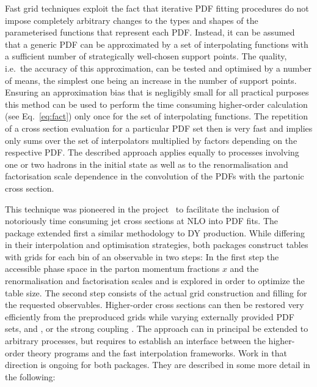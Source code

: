 \begin{description}
  Fast grid techniques exploit the fact that iterative PDF fitting
  procedures do not impose completely arbitrary changes to the types
  and shapes of the parameterised functions that represent each PDF\@.
  Instead, it can be assumed that a generic PDF can be approximated by
  a set of interpolating functions with a sufficient number of
  strategically well-chosen support points. The quality, i.e.\ the
  accuracy of this approximation, can be tested and optimised by a
  number of means, the simplest one being an increase in the number of
  support points. Ensuring an approximation bias that is negligibly
  small for all practical purposes this method can be used to perform
  the time consuming higher-order calculation (see Eq.~\ref{eq:fact})
  only once for the set of interpolating functions. 
  The repetition of a cross section evaluation for
  a particular PDF set then is very fast and implies only sums over
  the set of interpolators multiplied by factors depending on the
  respective PDF\@. The described approach applies equally to
  processes involving one or two hadrons in the initial state as well
  as to the renormalisation and factorisation scale dependence in the
  convolution of the PDFs with the partonic cross section.

  This technique was pioneered in the \fastnlo
  project~\cite{Kluge:2006xs} to facilitate the inclusion of
  notoriously time consuming jet cross sections at NLO into PDF fits.
  The \applgrid~\cite{Carli:2010rw} package extended first a similar
  methodology to DY production. While differing in their interpolation
  and optimisation strategies, both packages construct tables with
  grids for each bin of an observable in two steps: In the first step
  the accessible phase space in the parton momentum fractions $x$ and
  the renormalisation and factorisation scales \mur and \muf is
  explored in order to optimize the table size. The second step
  consists of the actual grid construction and filling for the
  requested observables. Higher-order cross sections can then be
  restored very efficiently from the preproduced grids while varying
  externally provided PDF sets, \mur and \muf, or the strong coupling
  \asq\@. The approach can in principal be extended to arbitrary
  processes, but requires to establish an interface between the
  higher-order theory programs and the fast interpolation
  frameworks. Work in that direction is ongoing for both packages.
  They are described in some more detail in the following:


\end{description}
